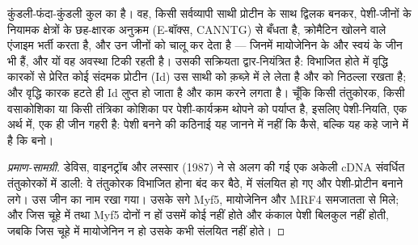\begin{proposition}[MyoD: एक प्रमुख स्विच]\label{prop:b2:cell-differentiation:myod}
 कुंडली-फंदा-कुंडली कुल का  है। वह,
किसी सर्वव्यापी साथी प्रोटीन के साथ द्विलक बनकर, पेशी-जीनों के नियामक
क्षेत्रों के छह-क्षारक अनुक्रम (E-बॉक्स, CANNTG) से
बँधता है, क्रोमैटिन खोलने वाले एंजाइम भर्ती करता है, और उन जीनों को चालू
कर देता है --- जिनमें मायोजेनिन के और स्वयं  के जीन भी हैं, और
यों वह अवस्था टिकी रहती है। उसकी सक्रियता द्वार-नियंत्रित है: विभाजित
होते  में वृद्धि कारकों से प्रेरित कोई संदमक प्रोटीन (Id)
उस साथी को क़ब्ज़े में ले लेता है और  को निठल्ला रखता है; और वृद्धि
कारक हटते ही Id लुप्त हो जाता है और  काम करने लगता है। चूँकि 
किसी तंतुकोरक, किसी वसाकोशिका या किसी तंत्रिका कोशिका पर पेशी-कार्यक्रम
थोपने को पर्याप्त है, इसलिए पेशी-नियति, एक अर्थ में, एक ही जीन गहरी है:
पेशी बनने की कठिनाई यह जानने में नहीं कि कैसे, बल्कि यह कहे जाने में है कि बनो।
\end{proposition}
\begin{proof}[प्रमाण-सामग्री]
डेविस, वाइनट्रॉब और लस्सार (1987) ने  से अलग की गई एक अकेली
cDNA संवर्धित तंतुकोरकों में डाली: वे तंतुकोरक
विभाजित होना बंद कर बैठे,  में संलयित हो गए और पेशी-प्रोटीन बनाने लगे।
उस जीन का नाम  रखा गया। उसके सगे Myf5, मायोजेनिन और MRF4
समजातता से मिले; और जिस चूहे में  तथा Myf5 दोनों न हों उसमें कोई
 नहीं होते और कंकाल पेशी बिलकुल नहीं होती, जबकि जिस चूहे में
मायोजेनिन न हो उसके  कभी संलयित नहीं होते।
\end{proof}

